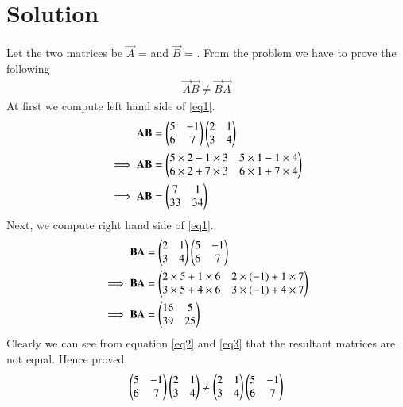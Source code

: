 \documentclass[journal,12pt,twocolumn]{IEEEtran}
\begin{document}
\section{\textbf{Solution}}
Let the two matrices be $\vec{A}$ =  and $\vec{B}$ = . From the problem we have to prove the following
\begin{align}\label{eq1}
\vec{A}\vec{B} \not= \vec{B}\vec{A}
\end{align}
At first we compute left hand side of \ref{eq1}.
\begin{align}
\mathbf{A}\mathbf{B} &= \begin{pmatrix}5 & -1\\6 & 7\end{pmatrix}\begin{pmatrix}2 & 1\\3 & 4\end{pmatrix}\\
\implies \mathbf{A}\mathbf{B} &= \begin{pmatrix}5\times2-1\times3 & 5\times1-1\times4\\6\times2+7\times3 & 6\times1+7\times4\end{pmatrix}\\
\implies\mathbf{A}\mathbf{B} &= \begin{pmatrix}7 & 1\\33 & 34\end{pmatrix}\label{eq2}
\end{align}
Next, we compute right hand side of \ref{eq1}.
\begin{align}
\mathbf{B}\mathbf{A} &= \begin{pmatrix}2 & 1\\3 & 4\end{pmatrix}\begin{pmatrix}5 & -1\\6 & 7\end{pmatrix}\\
\implies \mathbf{B}\mathbf{A} &= \begin{pmatrix}2\times5+1\times6 & 2\times(-1)+1\times7\\3\times5+4\times6 & 3\times(-1)+4\times7\end{pmatrix}\\
\implies\mathbf{B}\mathbf{A} &= \begin{pmatrix}16 & 5\\39 & 25\end{pmatrix}\label{eq3}
\end{align}
Clearly we can see from equation \ref{eq2} and \ref{eq3} that the resultant matrices are not equal. Hence proved,
\begin{align*}
\begin{pmatrix}5 & -1\\6 & 7\end{pmatrix}\begin{pmatrix}2 & 1\\3 & 4\end{pmatrix} \not= \begin{pmatrix}2 & 1\\3 & 4\end{pmatrix}\begin{pmatrix}5 & -1\\6 & 7\end{pmatrix}
\end{align*}
\begin{comment}
\textbf{Python Code: }The code for the solution can be found at \url{https://github.com/Arko98/EE5609/blob/master/Assignment_2/Codes/Figure.py}
\end{comment}
\end{document}
